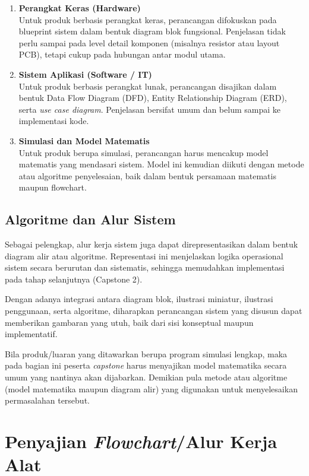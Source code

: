 \begin{enumerate}
    \item \textbf{Perangkat Keras (Hardware)} \\
    Untuk produk berbasis perangkat keras, perancangan difokuskan pada blueprint sistem dalam bentuk diagram blok fungsional. Penjelasan tidak perlu sampai pada level detail komponen (misalnya resistor atau layout PCB), tetapi cukup pada hubungan antar modul utama.

    \item \textbf{Sistem Aplikasi (Software / IT)} \\
    Untuk produk berbasis perangkat lunak, perancangan disajikan dalam bentuk Data Flow Diagram (DFD), Entity Relationship Diagram (ERD), serta \textit{use case diagram}. Penjelasan bersifat umum dan belum sampai ke implementasi kode.

    \item \textbf{Simulasi dan Model Matematis} \\
    Untuk produk berupa simulasi, perancangan harus mencakup model matematis yang mendasari sistem. Model ini kemudian diikuti dengan metode atau algoritme penyelesaian, baik dalam bentuk persamaan matematis maupun flowchart.
\end{enumerate}

\subsection{Algoritme dan Alur Sistem}
\label{subsec:algoritme_umum}

Sebagai pelengkap, alur kerja sistem juga dapat direpresentasikan dalam bentuk diagram alir atau algoritme. Representasi ini menjelaskan logika operasional sistem secara berurutan dan sistematis, sehingga memudahkan implementasi pada tahap selanjutnya (Capstone 2).

Dengan adanya integrasi antara diagram blok, ilustrasi miniatur, ilustrasi penggunaan, serta algoritme, diharapkan perancangan sistem yang disusun dapat memberikan gambaran yang utuh, baik dari sisi konseptual maupun implementatif.

Bila produk/luaran yang ditawarkan berupa program simulasi lengkap, maka pada bagian ini peserta \textit{capstone} harus menyajikan model matematika secara umum yang nantinya akan dijabarkan. Demikian pula metode atau algoritme (model matematika maupun diagram alir) yang digunakan untuk menyelesaikan permasalahan tersebut.

\section{Penyajian \textit{Flowchart}/Alur Kerja Alat}
    
